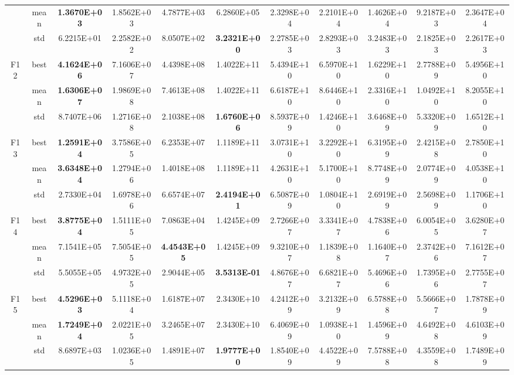 \documentclass{wzuthesis}
\begin{document}
\begin{longtable}{ccccccccccc}
          & mean  & \textbf{1.3670E+03} & 1.8562E+03 & 4.7877E+03 & 6.2860E+05 & 2.3298E+04 & 2.2101E+04 & 1.4626E+04 & 9.2187E+03 & 2.3647E+04 \\
          & std   & 6.2215E+01 & 2.2582E+02 & 8.0507E+02 & \textbf{3.2321E+00} & 2.2785E+03 & 2.8293E+03 & 3.2483E+03 & 2.1825E+03 & 2.2617E+03 \\
\multirow{3}[0]{*}{F12} & best  & \textbf{4.1624E+06} & 7.1606E+07 & 4.4398E+08 & 1.4022E+11 & 5.4394E+10 & 6.5970E+10 & 1.6229E+10 & 2.7788E+09 & 5.4956E+10 \\
          & mean  & \textbf{1.6306E+07} & 1.9869E+08 & 7.4613E+08 & 1.4022E+11 & 6.6187E+10 & 8.6446E+10 & 2.3316E+10 & 1.0492E+10 & 8.2055E+10 \\
          & std   & 8.7407E+06 & 1.2716E+08 & 2.1038E+08 & \textbf{1.6760E+06} & 8.5937E+09 & 1.4246E+10 & 3.6468E+09 & 5.3320E+09 & 1.6512E+10 \\
\multirow{3}[0]{*}{F13} & best  & \textbf{1.2591E+04} & 3.7586E+05 & 6.2353E+07 & 1.1189E+11 & 3.0731E+10 & 3.2292E+10 & 6.3195E+09 & 2.4215E+08 & 2.7850E+10 \\
          & mean  & \textbf{3.6348E+04} & 1.2794E+06 & 1.4018E+08 & 1.1189E+11 & 4.2631E+10 & 5.1700E+10 & 8.7748E+09 & 2.0774E+09 & 4.0538E+10 \\
          & std   & 2.7330E+04 & 1.6978E+06 & 6.6574E+07 & \textbf{2.4194E+01} & 6.5087E+09 & 1.0804E+10 & 2.6919E+09 & 2.5698E+09 & 1.1706E+10 \\
\multirow{3}[0]{*}{F14} & best  & \textbf{3.8775E+04} & 1.5111E+05 & 7.0863E+04 & 1.4245E+09 & 2.7266E+07 & 3.3341E+07 & 4.7838E+06 & 6.0054E+05 & 3.6280E+07 \\
          & mean  & 7.1541E+05 & 7.5054E+05 & \textbf{4.4543E+05} & 1.4245E+09 & 9.3210E+07 & 1.1839E+08 & 1.1640E+07 & 2.3742E+06 & 7.1612E+07 \\
          & std   & 5.5055E+05 & 4.9732E+05 & 2.9044E+05 & \textbf{3.5313E-01} & 4.8676E+07 & 6.6821E+07 & 5.4696E+06 & 1.7395E+06 & 2.7755E+07 \\
\multirow{3}[0]{*}{F15} & best  & \textbf{4.5296E+03} & 5.1118E+04 & 1.6187E+07 & 2.3430E+10 & 4.2412E+09 & 3.2132E+09 & 6.5788E+08 & 5.5666E+07 & 1.7878E+09 \\
          & mean  & \textbf{1.7249E+04} & 2.0221E+05 & 3.2465E+07 & 2.3430E+10 & 6.4069E+09 & 1.0938E+10 & 1.4596E+09 & 4.6492E+08 & 4.6103E+09 \\
          & std   & 8.6897E+03 & 1.0236E+05 & 1.4891E+07 & \textbf{1.9777E+00} & 1.8540E+09 & 4.4522E+09 & 7.5788E+08 & 4.3559E+08 & 1.7489E+09 \\

\end{longtable}
\end{document}
